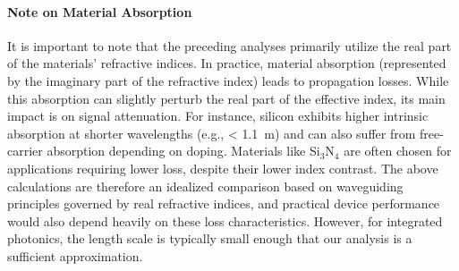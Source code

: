 \documentclass[10pt, a4paper]{article}
\begin{document}
\paragraph{Note on Material Absorption}
It is important to note that the preceding analyses primarily utilize the real part of the materials' refractive indices. In practice, material absorption (represented by the imaginary part of the refractive index) leads to propagation losses. While this absorption can slightly perturb the real part of the effective index, its main impact is on signal attenuation. For instance, silicon exhibits higher intrinsic absorption at shorter wavelengths (e.g., < 1.1~{\textmu}m) and can also suffer from free-carrier absorption depending on doping. Materials like Si$_3$N$_4$ are often chosen for applications requiring lower loss, despite their lower index contrast. The above calculations are therefore an idealized comparison based on waveguiding principles governed by real refractive indices, and practical device performance would also depend heavily on these loss characteristics. However, for integrated photonics, the length scale is typically small enough that our analysis is a sufficient approximation.

\printbibliography
\end{document}
